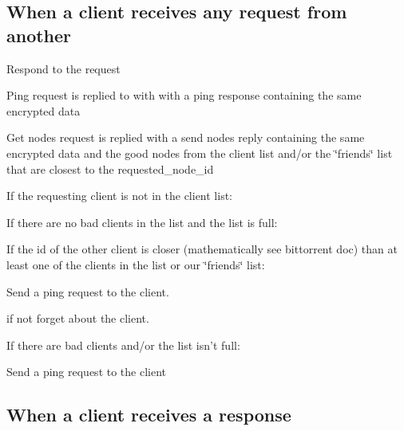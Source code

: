 \subsection*{When a client receives any request from another }


\begin{DoxyItemize}
\item Respond to the request
\begin{DoxyItemize}
\item Ping request is replied to with with a ping response containing the same encrypted data
\item Get nodes request is replied with a send nodes reply containing the same encrypted data and the good nodes from the client list and/or the \char`\"{}friends\char`\"{} list that are closest to the requested\+\_\+node\+\_\+id
\end{DoxyItemize}
\item If the requesting client is not in the client list\+:
\begin{DoxyItemize}
\item If there are no bad clients in the list and the list is full\+:
\begin{DoxyItemize}
\item If the id of the other client is closer (mathematically see bittorrent doc) than at least one of the clients in the list or our \char`\"{}friends\char`\"{} list\+:
\begin{DoxyItemize}
\item Send a ping request to the client.
\end{DoxyItemize}
\item if not forget about the client.
\end{DoxyItemize}
\item If there are bad clients and/or the list isn't full\+:
\begin{DoxyItemize}
\item Send a ping request to the client
\end{DoxyItemize}
\end{DoxyItemize}
\end{DoxyItemize}

\subsection*{When a client receives a response }


